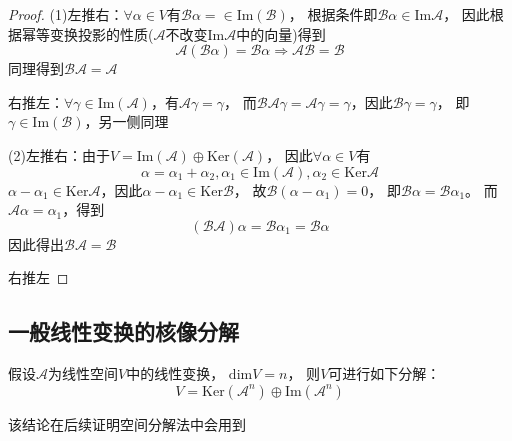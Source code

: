 \begin{proof}
  (1)左推右：$\forall \alpha \in V$有$\mathcal{B} \alpha = \in \mathrm{Im}(\mathcal{B})$，
  根据条件即$\mathcal{B}\alpha \in \mathrm{Im}\mathcal{A}$，
  因此根据幂等变换投影的性质($\mathcal{A}$不改变$\mathrm{Im}\mathcal{A}$中的向量)得到
  \begin{equation*}
    \mathcal{A}(\mathcal{B} \alpha) = \mathcal{B} \alpha \Rightarrow \mathcal{A}\mathcal{B} = \mathcal{B}
  \end{equation*}
  同理得到$\mathcal{B}\mathcal{A} = \mathcal{A}$

  右推左：$\forall \gamma \in \mathrm{Im}(\mathcal{A})$，有$\mathcal{A} \gamma = \gamma$，
  而$\mathcal{B}\mathcal{A} \gamma = \mathcal{A} \gamma = \gamma$，因此$\mathcal{B} \gamma = \gamma$，
  即$\gamma \in \mathrm{Im}(\mathcal{B})$，另一侧同理

  (2)左推右：由于$V = \mathrm{Im}(\mathcal{A}) \oplus \mathrm{Ker}(\mathcal{A})$，
  因此$\forall \alpha \in V$有
  \begin{equation*}
    \alpha = \alpha_1 + \alpha_2, \alpha_1 \in \mathrm{Im}(\mathcal{A}), \alpha_2 \in \mathrm{Ker}\mathcal{A}
  \end{equation*}
  $\alpha - \alpha_1 \in \mathrm{Ker}\mathcal{A}$，因此$\alpha - \alpha_1 \in \mathrm{Ker}\mathcal{B}$，
  故$\mathcal{B}(\alpha - \alpha_1) = 0$，
  即$\mathcal{B} \alpha = \mathcal{B} \alpha_1$。
  而$\mathcal{A} \alpha = \alpha_1$，得到
  \begin{equation*}
    (\mathcal{B}\mathcal{A})\alpha = \mathcal{B}\alpha_1 = \mathcal{B} \alpha
  \end{equation*}
  因此得出$\mathcal{B}\mathcal{A} = \mathcal{B}$

  右推左
\end{proof}

\subsection{一般线性变换的核像分解}

\begin{theorem}[线性变换核像空间分解]
  假设$\mathcal{A}$为线性空间$V$中的线性变换，
  $\mathrm{dim}V = n$，
  则$V$可进行如下分解：
  \begin{equation*}
    V = \mathrm{Ker}(\mathcal{A}^n) \oplus \mathrm{Im}(\mathcal{A}^n)
  \end{equation*}
\end{theorem}

\begin{note}
  该结论在后续证明空间分解法中会用到
\end{note}


